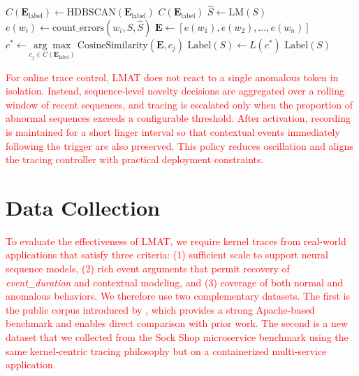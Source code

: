 \documentclass[preprint,12pt]{elsarticle}
\begin{document}
\begin{algorithm}[tbp]
  \footnotesize               %
  \caption{Clustering and classification using error vectors.}
  \label{alg:root-cause}
  \begin{algorithmic}[1]
\label{algroot-cause}
    \State $C(\mathbf{E}_{\text{label}}) \gets \text{HDBSCAN}(\mathbf{E}_{\text{label}})$ 
    \State \Return $C(\mathbf{E}_{\text{label}})$
\EndProcedure
\Statex
{}
    \State $\hat{S} \gets \text{LM}(S)$ 
        \State $e(w_i) \gets \text{count\_errors}(w_i, S, \hat{S})$
    \EndFor {}
    \State $\mathbf{E} \gets [e(w_1), e(w_2), \ldots, e(w_n)]$ 
    \State $c^* \gets \underset{c_j \in C(\mathbf{E}_{\text{label}})}{\arg\max} \ \text{CosineSimilarity}(\mathbf{E}, c_j)$ 
    \State $\text{Label}(S) \gets L(c^*)$ 
    \State \Return $\text{Label}(S)$
\EndProcedure
  \end{algorithmic}
\end{algorithm}

\textcolor{red}{For online trace control, LMAT does not react to a single anomalous token in isolation. Instead, sequence-level novelty decisions are aggregated over a rolling window of recent sequences, and tracing is escalated only when the proportion of abnormal sequences exceeds a configurable threshold. After activation, recording is maintained for a short linger interval so that contextual events immediately following the trigger are also preserved. This policy reduces oscillation and aligns the tracing controller with practical deployment constraints.}


\section{Data Collection}\label{dcollection}
\textcolor{red}{To evaluate the effectiveness of LMAT, we require kernel traces from real-world applications that satisfy three criteria: (1) sufficient scale to support neural sequence models, (2) rich event arguments that permit recovery of \textit{event\_duration} and contextual modeling, and (3) coverage of both normal and anomalous behaviors. We therefore use two complementary datasets. The first is the public corpus introduced by \cite{fournier2023language}, which provides a strong Apache-based benchmark and enables direct comparison with prior work. The second is a new dataset that we collected from the Sock Shop microservice benchmark using the same kernel-centric tracing philosophy but on a containerized multi-service application.}
\end{document}
